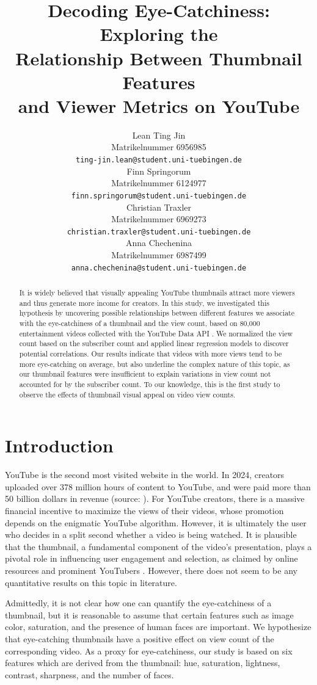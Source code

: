\documentclass{article}
\title{Decoding Eye-Catchiness: Exploring the\\Relationship Between Thumbnail Features\\and Viewer Metrics on YouTube}
\author{%
  Lean Ting Jin\\
  Matrikelnummer 6956985\\
  \fontsize{8.5}{11}\texttt{ting-jin.lean@student.uni-tuebingen.de} \\
  \And
  Finn Springorum\\
  Matrikelnummer 6124977\\
  \fontsize{8.5}{11}\texttt{finn.springorum@student.uni-tuebingen.de} \\
  \And
  Christian Traxler\\
  Matrikelnummer 6969273\\
  \fontsize{8.5}{11}\texttt{christian.traxler@student.uni-tuebingen.de} \\
  \And
  Anna Chechenina\\
  Matrikelnummer 6987499\\
  \fontsize{8.5}{11}\texttt{anna.chechenina@student.uni-tuebingen.de} \\
}
\begin{document}
\maketitle

\begin{abstract}
  It is widely believed that visually appealing YouTube thumbnails attract more viewers and thus generate more income for creators. In this study, we investigated this hypothesis by uncovering possible relationships between different features we associate with the eye-catchiness of a thumbnail and the view count, based on 80,000 entertainment videos collected with the YouTube Data API \cite{youtubeapi}. We normalized the view count based on the subscriber count and applied linear regression models to discover potential correlations. Our results indicate that videos with more views tend to be more eye-catching on average, but also underline the complex nature of this topic, as our thumbnail features were insufficient to explain variations in view count not accounted for by the subscriber count. To our knowledge, this is the first study to observe the effects of thumbnail visual appeal on video view counts.

\end{abstract}

\section{Introduction}
YouTube is the second most visited website in the world. In 2024, creators uploaded over 378 million hours of content to YouTube, and were paid more than 50 billion dollars in revenue (source: \cite{youtube-stats}). For YouTube creators, there is a massive financial incentive to maximize the views of their videos, whose promotion depends on the enigmatic YouTube algorithm. However, it is ultimately the user who decides in a split second whether a video is being watched. It is plausible that the thumbnail, a fundamental component of the video's presentation, plays a pivotal role in influencing user engagement and selection, as claimed by online resources \cite{} and prominent YouTubers \cite{}. However, there does not seem to be any quantitative results on this topic in literature.


Admittedly, it is not clear how one can quantify the eye-catchiness of a thumbnail, but it is reasonable to assume that certain features such as image color, saturation, and the presence of human faces are important. We hypothesize that eye-catching thumbnails have a positive effect on view count of the corresponding video. As a proxy for eye-catchiness, our study is based on six features which are derived from the thumbnail: hue, saturation, lightness, contrast, sharpness, and the number of faces.
\end{document}

